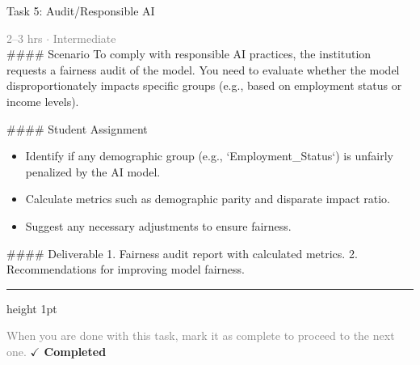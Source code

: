 \documentclass[10pt,a4paper]{article}
\begin{document}
\begin{taskbox}{Task 5: Audit/Responsible AI}

    {\small \textcolor{gray}{2--3 hrs $\cdot$ Intermediate}}\\[12pt]

    \#\#\#\# Scenario  
To comply with responsible AI practices, the institution requests a fairness audit of the model. You need to evaluate whether the model disproportionately impacts specific groups (e.g., based on employment status or income levels).  

\#\#\#\# Student Assignment  
\begin{itemize}
    \item Identify if any demographic group (e.g., `Employment\_Status`) is unfairly penalized by the AI model.  
    \item Calculate metrics such as demographic parity and disparate impact ratio.  
    \item Suggest any necessary adjustments to ensure fairness.  
\end{itemize}

\#\#\#\# Deliverable  
1. Fairness audit report with calculated metrics.  
2. Recommendations for improving model fairness.\par

    \vspace{16pt}

    \textcolor{cardBorder}{\hrule height 1pt}\vspace{8pt}

    \small \textcolor{gray}{When you are done with this task, mark it as complete to proceed to the next one.} \hfill \textbf{\textcolor{brandDark}{$\checkmark$ Completed}}

\end{taskbox}
\end{document}
